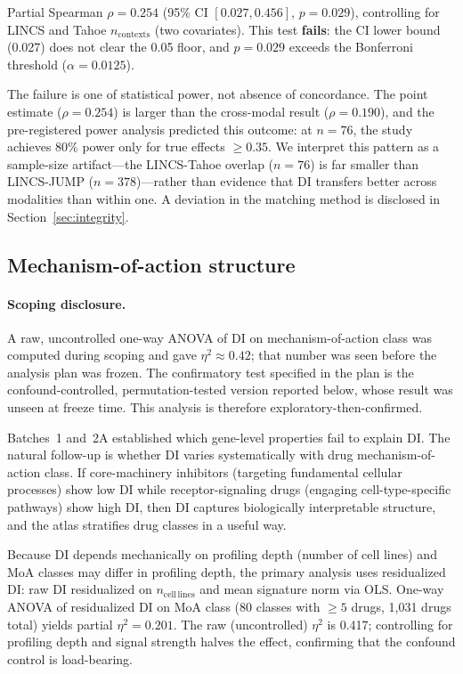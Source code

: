 \documentclass[11pt]{article}
\begin{document}
Partial Spearman $\rho = 0.254$ (95\% CI $[0.027, 0.456]$,
$p = 0.029$), controlling for LINCS and Tahoe $n_{\mathrm{contexts}}$
(two covariates).  This test \textbf{fails}: the CI lower bound
(0.027) does not clear the 0.05 floor, and $p = 0.029$ exceeds the
Bonferroni threshold ($\alpha = 0.0125$).

The failure is one of statistical power, not absence of concordance.
The point estimate ($\rho = 0.254$) is larger than the cross-modal result
($\rho = 0.190$), and the pre-registered power analysis predicted this
outcome: at $n = 76$, the study achieves 80\% power only for true
effects $\geq 0.35$.  We interpret this pattern as a sample-size
artifact---the LINCS-Tahoe overlap ($n = 76$) is far smaller than
LINCS-JUMP ($n = 378$)---rather than evidence that DI transfers better
across modalities than within one.  A deviation in the matching method
is disclosed in Section~\ref{sec:integrity}.

\subsection{Mechanism-of-action structure}
\label{sec:moa}

\paragraph{Scoping disclosure.}
A raw, uncontrolled one-way ANOVA of DI on mechanism-of-action class was computed
during scoping and gave $\eta^2 \approx 0.42$; that number was seen before the
analysis plan was frozen.  The confirmatory test specified in the plan is the
confound-controlled, permutation-tested version reported below, whose result was
unseen at freeze time.  This analysis is therefore exploratory-then-confirmed.

Batches~1 and~2A established which gene-level properties fail to explain DI.
The natural follow-up is whether DI varies systematically with drug
mechanism-of-action class.  If core-machinery inhibitors (targeting
fundamental cellular processes) show low DI while receptor-signaling
drugs (engaging cell-type-specific pathways) show high DI, then DI
captures biologically interpretable structure, and the atlas stratifies
drug classes in a useful way.

Because DI depends mechanically on profiling depth (number of cell
lines) and MoA classes may differ in profiling depth, the primary
analysis uses residualized DI: raw DI residualized on
$n_{\mathrm{cell\,lines}}$ and mean signature norm via OLS.  One-way
ANOVA of residualized DI on MoA class (80 classes with $\geq 5$ drugs,
1{,}031 drugs total) yields partial $\eta^2 = 0.201$.  The raw
(uncontrolled) $\eta^2$ is 0.417; controlling for profiling depth and
signal strength halves the effect, confirming that the confound control
is load-bearing.
\end{document}
